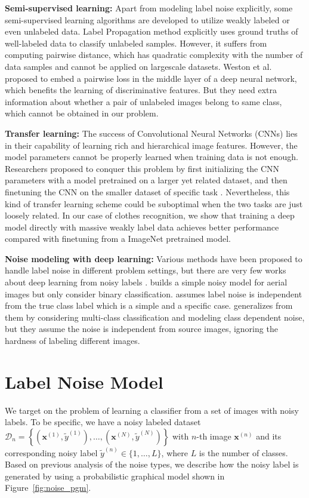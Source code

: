 \documentclass[10pt,twocolumn,letterpaper]{article}
\def\vec{\mathbf}
\begin{document}
{\bf Semi-supervised learning:} Apart from modeling label noise explicitly, some semi-supervised learning algorithms are developed to utilize weakly labeled or even unlabeled data. Label Propagation method \cite{zhu2002learning} explicitly uses ground truths of well-labeled data to classify unlabeled samples. However, it suffers from computing pairwise distance, which has quadratic complexity with the number of data samples and cannot be applied on largescale datasets. Weston et al. \cite{weston2012deep} proposed to embed a pairwise loss in the middle layer of a deep neural network, which benefits the learning of discriminative features. But they need extra information about whether a pair of unlabeled images belong to same class, which cannot be obtained in our problem.

{\bf Transfer learning:} The success of Convolutional Neural Networks (CNNs) lies in their capability of learning rich and hierarchical image features. However, the model parameters cannot be properly learned when training data is not enough. Researchers proposed to conquer this problem by first initializing the CNN parameters with a model pretrained on a larger yet related dataset, and then finetuning the CNN on the smaller dataset of specific task \cite{krizhevsky2012imagenet, oquab2013learning, azizpour2014generic}. Nevertheless, this kind of transfer learning scheme could be suboptimal when the two tasks are just loosely related. In our case of clothes recognition, we show that training a deep model directly with massive weakly label data achieves better performance compared with finetuning from a ImageNet pretrained model.

{\bf Noise modeling with deep learning:} Various methods have been proposed to handle label noise in different problem settings, but there are very few works about deep learning from noisy labels \cite{mnih2012learning, larsen1998design, sukhbaatar2014learning}. \cite{mnih2012learning} builds a simple noisy model for aerial images but only consider binary classification. \cite{larsen1998design} assumes label noise is independent from the true class label which is a simple and a specific case. \cite{sukhbaatar2014learning} generalizes from them by considering multi-class classification and modeling class dependent noise, but they assume the noise is independent from source images, ignoring the hardness of labeling different images.

\section{Label Noise Model} %
\label{sec:label_noise_model}
We target on the problem of learning a classifier from a set of images with noisy labels. To be specific, we have a noisy labeled dataset $\mathcal{D}_n=\left\{\left(\vec{x}^{(1)}, \tilde{y}^{(1)}\right), \dots, \left(\vec{x}^{(N)}, \tilde{y}^{(N)}\right)\right\}$ with $n$-th image $\vec{x}^{(n)}$ and its corresponding noisy label $\tilde{y}^{(n)} \in \{1,\dots,L\}$, where $L$ is the number of classes. Based on previous analysis of the noise types, we describe how the noisy label is generated by using a probabilistic graphical model shown in Figure~\ref{fig:noise_pgm}.
\end{document}

